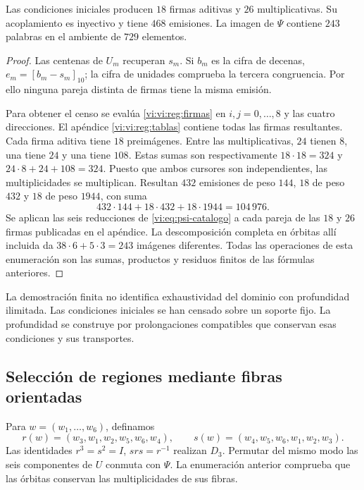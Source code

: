 \begin{proposition}
\label{vi:vi:reg:censo}
Las condiciones iniciales producen \(18\) firmas aditivas y \(26\)
multiplicativas. Su acoplamiento es inyectivo y tiene \(468\)
emisiones. La imagen de \(\Psi\) contiene \(243\) palabras en el
ambiente de \(729\) elementos.
\end{proposition}
\begin{proof}
Las centenas de \(U_m\) recuperan \(s_m\). Si \(b_m\) es la
cifra de decenas, \(e_m=[b_m-s_m]_{10}\); la cifra de unidades
comprueba la tercera congruencia. Por ello ninguna pareja distinta
de firmas tiene la misma emisión.

Para obtener el censo se evalúa \eqref{vi:vi:reg:firmas} en
\(i,j=0,\ldots,8\) y las cuatro direcciones. El apéndice
\ref{vi:vi:reg:tablas} contiene todas las firmas resultantes. Cada
firma aditiva tiene \(18\) preimágenes. Entre las multiplicativas,
\(24\) tienen \(8\), una tiene \(24\) y una tiene \(108\).
Estas sumas son respectivamente \(18\cdot18=324\) y
\(24\cdot8+24+108=324\). Puesto que ambos cursores son
independientes, las multiplicidades se multiplican. Resultan
\(432\) emisiones de peso \(144\), \(18\) de peso \(432\) y
\(18\) de peso \(1944\), con suma
\[
 432\cdot144+18\cdot432+18\cdot1944=104\,976.
\]
Se aplican las seis reducciones de \eqref{vi:eq:psi-catalogo} a cada pareja
de las \(18\) y \(26\) firmas publicadas en el apéndice. La
descomposición completa en órbitas allí incluida da
\(38\cdot6+5\cdot3=243\) imágenes diferentes. Todas las
operaciones de esta enumeración son las sumas, productos y residuos
finitos de las fórmulas anteriores.
\end{proof}

La demostración finita no identifica exhaustividad del dominio con
profundidad ilimitada. Las condiciones iniciales se han censado sobre
un soporte fijo. La profundidad se construye por prolongaciones
compatibles que conservan esas condiciones y sus transportes.

\subsection{Selección de regiones mediante fibras orientadas}

Para \(w=(w_1,\ldots,w_6)\), definamos
\[
 r(w)=(w_3,w_1,w_2,w_5,w_6,w_4),\qquad
 s(w)=(w_4,w_5,w_6,w_1,w_2,w_3).
\]
Las identidades \(r^3=s^2=I\), \(srs=r^{-1}\) realizan
\(D_3\). Permutar del mismo modo las seis componentes de \(U\)
conmuta con \(\Psi\). La enumeración anterior comprueba que las
órbitas conservan las multiplicidades de sus fibras.

